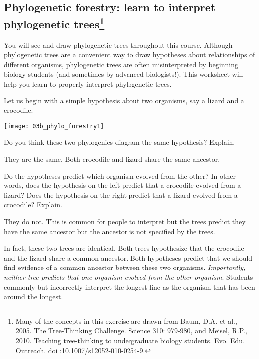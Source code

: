 \documentclass[12pt, hidelinks]{exam}
\newcommand*\AnswerBox[2]{%
    \parbox[t][#1]{0.92\textwidth}{%
    \begin{solution}#2\end{solution}}
}
\begin{document}
\subsection*{Phylogenetic forestry: learn to interpret phylogenetic trees\footnote{Many of the concepts in this exercise are drawn from Baum, D.A. et al., 2005. The Tree-Thinking Challenge. Science 310: 979-980, and Meisel, R.P., 2010. Teaching tree-thinking to undergraduate biology students. Evo. Edu. Outreach. doi :10.1007/s12052-010-0254-9.}}

You will see and draw phylogenetic trees throughout this course.
Although phylogenetic trees are a convenient way to draw hypotheses about
relationships of different organisms, phylogenetic trees are often
misinterpreted by beginning biology students (and sometimes by advanced
biologists!). This worksheet will help you learn to properly interpret
phylogenetic trees.

Let us begin with a simple hypothesis about two organisms, say a lizard
and a crocodile. %

\begin{center}%
	\noindent\texttt{[image: 03b\_phylo\_forestry1]}
\end{center}

\begin{questions}

\question
Do you think these two phylogenies diagram the same
hypothesis? Explain.

\AnswerBox{5\baselineskip}{They are the same. Both crocodile and lizard
share the same ancestor.}

\question
Do the hypotheses predict which organism evolved from the
other? In other words, does the hypothesis on the left predict that a
crocodile evolved from a lizard? Does the hypothesis on the right
predict that a lizard evolved from a crocodile? Explain.

\AnswerBox{5\baselineskip}{They do not. This is common for people to 
interpret but the trees predict they have the same ancestor but the ancestor
is not specified by the trees.}

\end{questions}

In fact, these two trees are identical. Both trees hypothesize that the
crocodile and the lizard share a common ancestor. Both hypotheses
predict that we should find evidence of a
common ancestor between these two organisms. \emph{Importantly, neither
tree predicts that one organism evolved from the other organism}.
Students commonly but incorrectly interpret the longest line as the organism that has
been around the longest.
\end{document}
